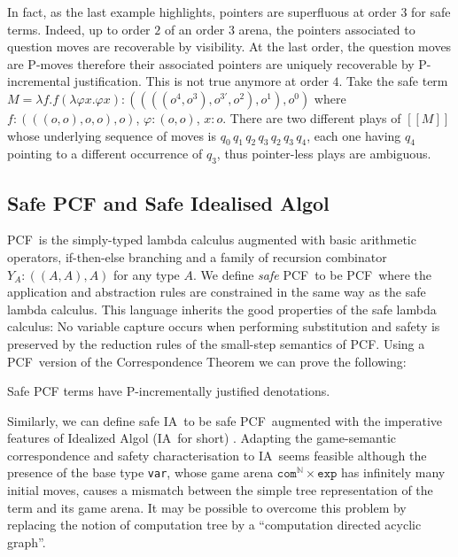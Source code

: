 \documentclass{llncs}
\newcommand\nat{\mathbb{N}}
\newcommand{\sem}[1]{{[\![ #1 ]\!]}}
\newcommand\ialgol{\textsf{IA}}
\newcommand\iacom{\texttt{com}}
\newcommand\iaexp{\texttt{exp}}
\newcommand\iavar{\texttt{var}}
\newcommand\pcf{\textsf{PCF}}
\begin{document}
In fact, as the last example highlights, pointers are superfluous at
order $3$ for safe terms. Indeed, up to order $2$ of an order $3$
arena, the pointers associated to question moves are recoverable by
visibility.  At the last order, the question moves are P-moves
therefore their associated pointers are uniquely recoverable by
P-incremental justification. This is not true anymore at order $4$.
Take the safe term $M = \lambda f . f (\lambda \varphi x . \varphi x)
: ((((o^4,o^3),o^{3'},o^2),o^1),o^0)$ where $f:(((o,o),o,o),o)$,
$\varphi:(o,o)$, $x:o$. There are two different plays of $\sem{M}$
whose underlying sequence of moves is $q_0 \, q_1 \, q_2 \, q_3 \, q_2
\, q_3 \, q_4$, each one having $q_4$ pointing to a different
occurrence of $q_3$, thus pointer-less plays are ambiguous.

\subsection*{Safe PCF and Safe Idealised Algol}

\pcf\ is the simply-typed lambda calculus augmented with basic
arithmetic operators, if-then-else branching and a family of recursion
combinator $Y_A : ((A,A),A)$ for any type $A$.  We define \emph{safe}
\pcf\ to be \pcf\ where the application and abstraction rules are
constrained in the same way as the safe lambda calculus.  This
language inherits the good properties of the safe lambda calculus: No
variable capture occurs when performing substitution and safety is
preserved by the reduction rules of the small-step semantics of
\pcf. Using a \pcf\ version of the Correspondence Theorem we can prove
the following:
\begin{theorem}
\label{thm:safepcfpincr}
Safe PCF terms have P-incrementally justified denotations.
\end{theorem}

Similarly, we can define safe \ialgol\ to be safe \pcf\ augmented with
the imperative features of Idealized Algol (\ialgol\ for short)
\cite{Reynolds81}.  Adapting the game-semantic correspondence and
safety characterisation to \ialgol\ seems feasible although the
presence of the base type \iavar, whose game arena $\iacom^{\nat}
\times \iaexp$ has infinitely many initial moves, causes a mismatch
between the simple tree representation of the term and its game
arena. It may be possible to overcome this problem by replacing the
notion of computation tree by a ``computation directed acyclic
graph''.
\end{document}
